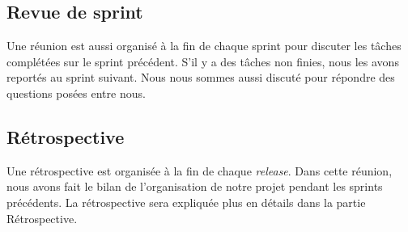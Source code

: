 \documentclass[a4paper,12pt]{article}
\begin{document}
\subsection{Revue de sprint}
Une réunion est aussi organisé à la fin de chaque sprint pour discuter les tâches complétées sur le sprint précédent. S'il y a des tâches non finies, nous les avons reportés au sprint suivant. Nous nous sommes aussi discuté pour répondre des questions posées entre nous.

\subsection{Rétrospective}
Une rétrospective est organisée à la fin de chaque \textit{release}. Dans cette réunion, nous avons fait le bilan de l'organisation de notre projet pendant les sprints précédents.  La rétrospective sera expliquée plus en détails dans la partie Rétrospective.
\end{document}
